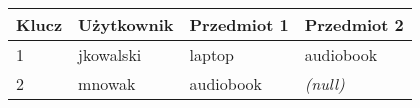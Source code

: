 \documentclass{beamer}
\begin{document}
\begin{frame}
		\begin{center}
			\begin{tabular}{l|l|l|l}
				\multicolumn{1}{c}{\textbf{Klucz}} & \multicolumn{1}{c}{\textbf{Użytkownik}} & \multicolumn{1}{c}{\textbf{Przedmiot 1}} & \textbf{Przedmiot 2} \\
				\hline
				\cellcolor{red!10}1 & \cellcolor{yellow!10}jkowalski & \cellcolor{yellow!10}laptop & \cellcolor{yellow!10}audiobook \\
				\hline
				\cellcolor{red!10}2 & \cellcolor{yellow!10}mnowak & \cellcolor{yellow!10}audiobook & \cellcolor{yellow!10}\textit{(null)} \\
				\hline
			\end{tabular}
		\end{center}
	\end{frame}
\end{document}
